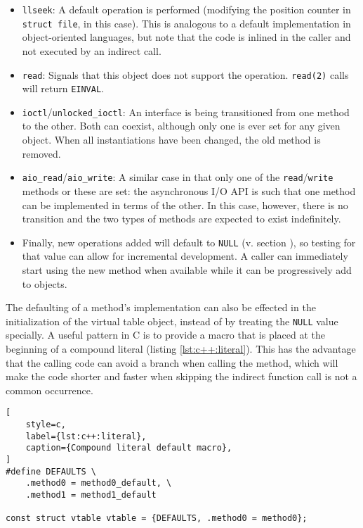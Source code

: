 \begin{itemize}
    \item \texttt{llseek}:
        A default operation is performed (modifying the position counter in
        \texttt{struct file}, in this case).  This is analogous to a default
        implementation in object-oriented languages, but note that the code is
        inlined in the caller and not executed by an indirect call.
    \item \texttt{read}:
        Signals that this object does not support the operation.
        \texttt{read(2)} calls will return \texttt{EINVAL}.
    \item \texttt{ioctl}/\texttt{unlocked\_ioctl}:
        An interface is being transitioned from one method to the other.  Both
        can coexist, although only one is ever set for any given object.  When
        all instantiations have been changed, the old method is removed.
    \item \texttt{aio\_read}/\texttt{aio\_write}:
        A similar case in that only one of the \texttt{read}/\texttt{write}
        methods or these are set: the asynchronous I/O API is such that one
        method can be implemented in terms of the other.  In this case, however,
        there is no transition and the two types of methods are expected to
        exist indefinitely.
    \item
        Finally, new operations added will default to \texttt{NULL} (v. section
        ), so testing for that value can allow for
        incremental development.  A caller can immediately start using the new
        method when available while it can be progressively add to objects.
\end{itemize}

The defaulting of a method's implementation can also be effected in the
initialization of the virtual table object, instead of by treating the
\texttt{NULL} value specially.  A useful pattern in C is to provide a macro that
is placed at the beginning of a compound literal (listing
\ref{lst:c++:literal}).  This has the advantage that the calling code can avoid
a branch when calling the method, which will make the code shorter and faster
when skipping the indirect function call is not a common occurrence.

\begin{lstlisting}[
    style=c,
    label={lst:c++:literal},
    caption={Compound literal default macro},
]
#define DEFAULTS \
    .method0 = method0_default, \
    .method1 = method1_default

const struct vtable vtable = {DEFAULTS, .method0 = method0};
\end{lstlisting}

